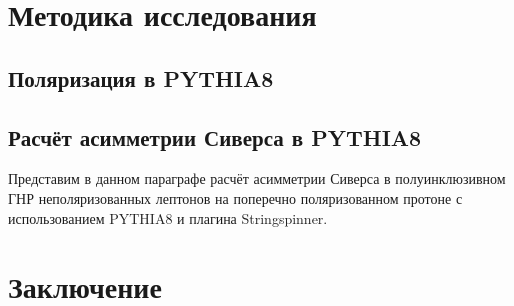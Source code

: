 \documentclass{extarticle}
\begin{document}
\newpage 
\section{Методика исследования}
\subsection{Поляризация в PYTHIA8}
\subsection{Расчёт асимметрии Сиверса в PYTHIA8}

Представим в данном параграфе расчёт асимметрии Сиверса в полуинклюзивном ГНР неполяризованных лептонов на поперечно поляризованном протоне с использованием PYTHIA8 и плагина Stringspinner.  

\newpage
\section*{Заключение}
\newpage
\printbibliography 
\end{document}
